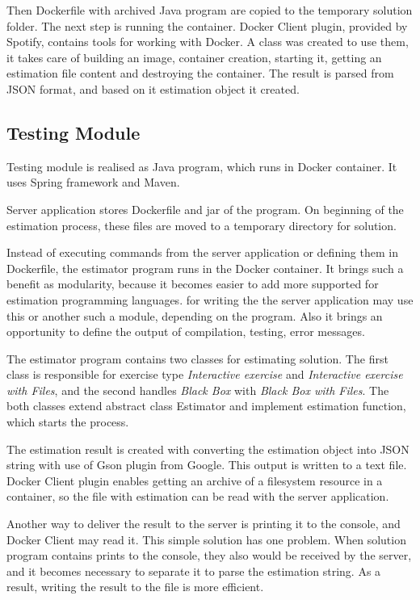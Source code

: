 Then Dockerfile with archived Java program are copied to the temporary solution folder. The next step is running the container. Docker Client plugin, provided by Spotify, contains tools for working with Docker. A class was created to use them, it takes care of building an image, container creation, starting it, getting an estimation file content and destroying the container. The result is parsed from JSON format, and based on it estimation object it created.


\subsection{Testing Module}
Testing module is realised as Java program, which runs in Docker container. It uses Spring framework and Maven.

Server application stores Dockerfile and jar of the program. On beginning of the estimation process, these files are moved to a temporary directory for solution. 

Instead of executing commands from the server application or defining them in Dockerfile, the estimator program runs in the Docker container. It brings such a benefit as modularity, because it becomes easier to add more supported for estimation programming languages. 
for writing the  the server application may use this or another such a module, depending on the program. Also it brings an opportunity to define the output of compilation, testing, error messages.

The estimator program contains two classes for estimating solution. The first class is responsible for exercise type \textit{Interactive exercise} and \textit{Interactive exercise with Files}, and the second handles \textit{Black Box} with \textit{Black Box with Files}. The both classes extend abstract class Estimator and implement estimation function, which starts the process.

The estimation result is created with converting the estimation object into JSON string with use of Gson plugin from Google. This output is written to a text file. Docker Client plugin enables getting an archive of a filesystem resource in a container, so the file with estimation can be read with the server application.

Another way to deliver the result to the server is printing it to the console, and Docker Client may read it. This simple solution has one problem. When solution program contains prints to the console, they also would be received by the server, and it becomes necessary to separate it to parse the estimation string. As a result, writing the result to the file is more efficient.


